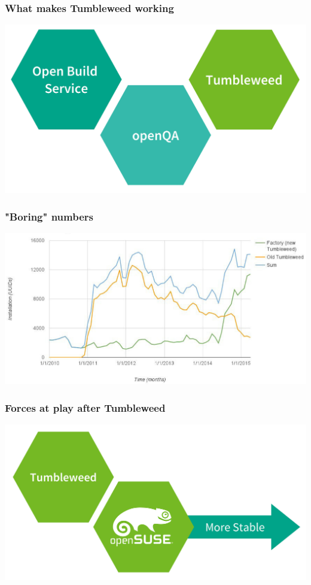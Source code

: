 \documentclass{beamer}
\begin{document}
\begin{frame}[t]
\frametitle{What makes Tumbleweed working}
\begin{center}
\includegraphics[width=.8\paperwidth]{tumbleweed-components}
\end{center}
\end{frame}

\begin{frame}[t]
\frametitle{"Boring" numbers}
\begin{center}
\includegraphics[width=.9\paperwidth]{tumbleweed-installs}
\end{center}
\end{frame}


\begin{frame}[t]
\frametitle{Forces at play after Tumbleweed}
\begin{center}
\vspace{1cm}
\includegraphics[width=.8\paperwidth]{partly-solved}
\end{center}
\end{frame}
\end{document}
